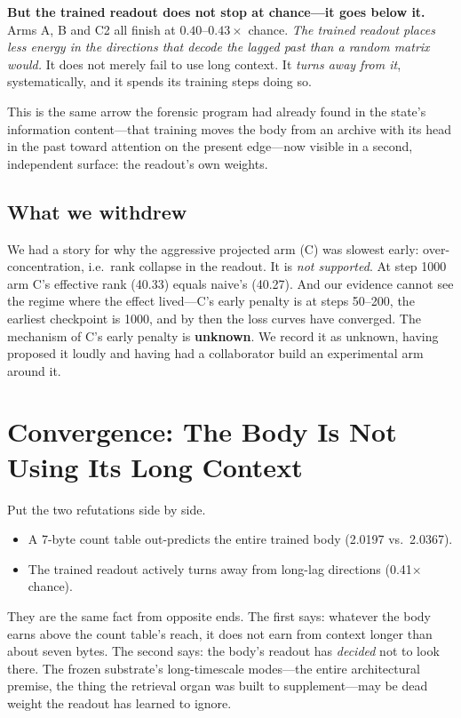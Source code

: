 \documentclass[11pt,a4paper]{article}
\begin{document}
\textbf{But the trained readout does not stop at chance---it goes below it.} Arms
A, B and C2 all finish at $0.40$--$0.43\times$ chance. \emph{The trained readout
places less energy in the directions that decode the lagged past than a random
matrix would.} It does not merely fail to use long context. It \emph{turns away
from it}, systematically, and it spends its training steps doing so.

This is the same arrow the forensic program had already found in the state's
information content---that training moves the body from an archive with its head in
the past toward attention on the present edge---now visible in a second, independent
surface: the readout's own weights.

\subsection{What we withdrew}

We had a story for why the aggressive projected arm (C) was slowest early:
over-concentration, i.e.\ rank collapse in the readout. It is \emph{not supported}.
At step 1000 arm C's effective rank (40.33) equals naive's (40.27). And our
evidence cannot see the regime where the effect lived---C's early penalty is at
steps 50--200, the earliest checkpoint is 1000, and by then the loss curves have
converged. The mechanism of C's early penalty is \textbf{unknown}. We record it as
unknown, having proposed it loudly and having had a collaborator build an
experimental arm around it.

\section{Convergence: The Body Is Not Using Its Long Context}

Put the two refutations side by side.

\begin{itemize}[leftmargin=1.5em]
\item A 7-byte count table out-predicts the entire trained body (2.0197 vs.\ 2.0367).
\item The trained readout actively turns away from long-lag directions (0.41$\times$ chance).
\end{itemize}

They are the same fact from opposite ends. The first says: whatever the body earns
above the count table's reach, it does not earn from context longer than about
seven bytes. The second says: the body's readout has \emph{decided} not to look
there. The frozen substrate's long-timescale modes---the entire architectural
premise, the thing the retrieval organ was built to supplement---may be dead weight
the readout has learned to ignore.
\end{document}
